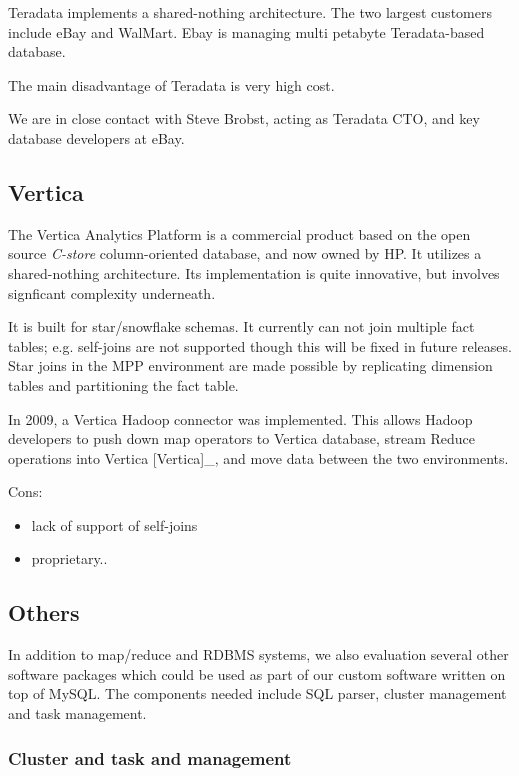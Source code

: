 \documentclass[DM,lsstdraft,toc]{lsstdoc}
\begin{document}
Teradata implements a shared-nothing architecture. The two largest
customers include eBay and WalMart. Ebay is managing multi petabyte
Teradata-based database.

The main disadvantage of Teradata is very high cost.

We are in close contact with Steve Brobst, acting as Teradata CTO, and
key database developers at eBay.

\subsection{Vertica}\label{vertica}

The Vertica Analytics Platform is a commercial product based on the open
source \emph{C-store} column-oriented database, and now owned by HP. It
utilizes a shared-nothing architecture. Its implementation is quite
innovative, but involves signficant complexity underneath.

It is built for star/snowflake schemas. It currently can not join
multiple fact tables; e.g. self-joins are not supported though this will
be fixed in future releases. Star joins in the MPP environment are made
possible by replicating dimension tables and partitioning the fact
table.

In 2009, a Vertica Hadoop connector was implemented. This allows Hadoop
developers to push down map operators to Vertica database, stream Reduce
operations into Vertica {[}Vertica{]}\_, and move data between the two
environments.

Cons:

\begin{itemize}
\item
  lack of support of self-joins
\item
  proprietary..
\end{itemize}

\subsection{Others}\label{others}

In addition to map/reduce and RDBMS systems, we also evaluation several
other software packages which could be used as part of our custom
software written on top of MySQL. The components needed include SQL
parser, cluster management and task management.

\subsubsection{Cluster and task and
management}\label{cluster-and-task-and-management}
\end{document}
